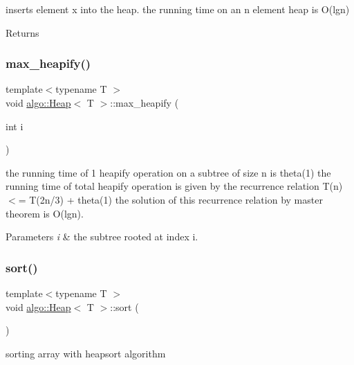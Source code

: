 inserts element x into the heap. the running time on an n element heap is O(lgn) \begin{DoxyReturn}{Returns}

\end{DoxyReturn}
\mbox{\label{classalgo_1_1_heap_a352e206b5bcf2ae6890e261eb9f5830f}} 
\subsubsection{\texorpdfstring{max\+\_\+heapify()}{max\_heapify()}}
{\footnotesize\ttfamily template$<$typename T $>$ \\
void \hyperlink{classalgo_1_1_heap}{algo\+::\+Heap}$<$ T $>$\+::max\+\_\+heapify (\begin{DoxyParamCaption}\item[{int}]{i }\end{DoxyParamCaption})\hspace{0.3cm}{\ttfamily [inline]}}

the running time of 1 heapify operation on a subtree of size n is theta(1) the running time of total heapify operation is given by the recurrence relation T(n) $<$= T(2n/3) + theta(1) the solution of this recurrence relation by master theorem is O(lgn). 
\begin{DoxyParams}{Parameters}
{\em i} & the subtree rooted at index i. \\
\hline
\end{DoxyParams}
\mbox{\label{classalgo_1_1_heap_ae6b1f6fc4660da54d5729da64a7cca94}} 
\subsubsection{\texorpdfstring{sort()}{sort()}}
{\footnotesize\ttfamily template$<$typename T $>$ \\
void \hyperlink{classalgo_1_1_heap}{algo\+::\+Heap}$<$ T $>$\+::sort (\begin{DoxyParamCaption}{ }\end{DoxyParamCaption})\hspace{0.3cm}{\ttfamily [inline]}}

sorting array with heapsort algorithm \mbox{\label{classalgo_1_1_heap_a4ad945dce3d137b3212cdbde13694832}} 
